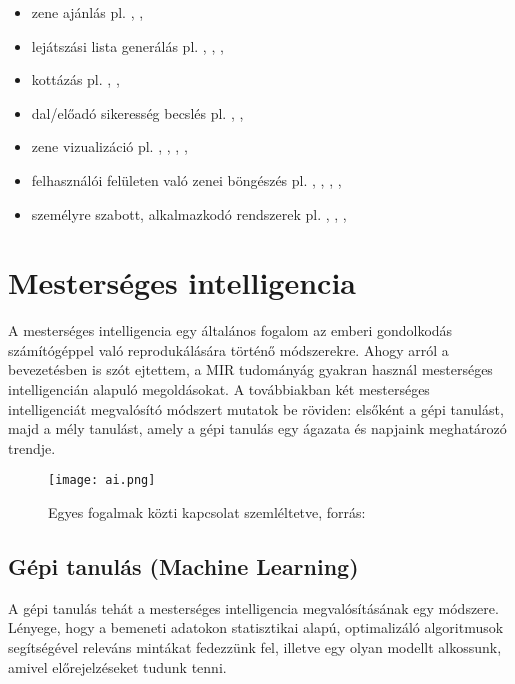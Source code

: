 \begin{itemize}
\begin{itemize}
	\item zene ajánlás pl. \cite{recommend1}, \cite{recommend2}, \cite{recommend3}
	\item lejátszási lista generálás  pl. \cite{playlist1}, \cite{playlist2}, \cite{playlist3}, \cite{playlist4}
	\item kottázás pl. \cite{score1}, \cite{score2}, \cite{score3}
	\item dal/előadó sikeresség becslés pl. \cite{popularity1}, \cite{popularity2}, \cite{popularity3}
	\item zene vizualizáció pl. \cite{visualization1}, \cite{visualization2}, \cite{visualization3}, \cite{visualization4}, \cite{visualization5}
	\item felhasználói felületen való zenei böngészés pl. \cite{ui1}, \cite{ui2}, \cite{ui3}, \cite{ui4}, \cite{ui5}
	\item személyre szabott, alkalmazkodó rendszerek pl. \cite{adaptive1}, \cite{adaptive2}, \cite{adaptive3}, \cite{adaptive4}
	\end{itemize}
\end{itemize}


\section{Mesterséges intelligencia}

A mesterséges intelligencia egy általános fogalom az emberi gondolkodás számítógéppel való reprodukálására történő módszerekre. Ahogy arról a bevezetésben is szót ejtettem, a MIR tudományág gyakran használ mesterséges intelligencián alapuló megoldásokat. A továbbiakban két mesterséges intelligenciát megvalósító módszert mutatok be röviden: elsőként a gépi tanulást, majd a mély tanulást, amely a gépi tanulás egy ágazata és napjaink meghatározó trendje. \cite{ai}

\begin{figure}[H]
  \texttt{[image: ai.png]}
  \caption{Egyes fogalmak közti kapcsolat szemléltetve, forrás: \cite{ai}}
\end{figure}

\subsection{Gépi tanulás (Machine Learning)}

A gépi tanulás tehát a mesterséges intelligencia megvalósításának egy módszere. Lényege, hogy a bemeneti adatokon statisztikai alapú, optimalizáló algoritmusok segítségével releváns mintákat fedezzünk fel, illetve egy olyan modellt alkossunk, amivel előrejelzéseket tudunk tenni. 

